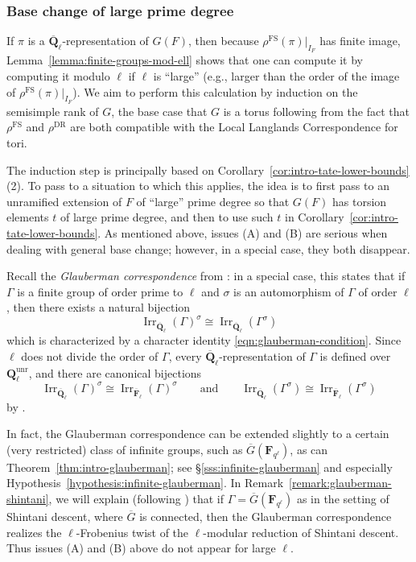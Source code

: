 \documentclass[reqno]{amsart}
\numberwithin{equation}{subsection}
\newcommand{\F}{\mathbf{F}}
\newcommand{\Q}{\mathbf{Q}}
\newcommand{\ol}[1]{\overline{#1}}
\DeclareMathOperator{\Irr}{Irr}
\DeclareMathOperator{\unr}{unr}
\DeclareMathOperator{\FS}{FS}
\DeclareMathOperator{\DR}{DR}
\theoremstyle{remark}
\numberwithin{equation}{subsection}
\numberwithin{figure}{subsection}
\begin{document}
\subsubsection{Base change of large prime degree}

If $\pi$ is a $\ol\Q_\ell$-representation of $G(F)$, then because $\rho^{\FS}(\pi)|_{I_F}$ has finite image, Lemma~\ref{lemma:finite-groups-mod-ell} shows that one can compute it by computing it modulo $\ell$ if $\ell$ is ``large'' (e.g., larger than the order of the image of $\rho^{\FS}(\pi)|_{I_F}$). We aim to perform this calculation by induction on the semisimple rank of $G$, the base case that $G$ is a torus following from the fact that $\rho^{\FS}$ and $\rho^{\DR}$ are both compatible with the Local Langlands Correspondence for tori.

The induction step is principally based on Corollary~\ref{cor:intro-tate-lower-bounds}(2). To pass to a situation to which this applies, the idea is to first pass to an unramified extension of $F$ of ``large'' prime degree so that $G(F)$ has torsion elements $t$ of large prime degree, and then to use such $t$ in Corollary~\ref{cor:intro-tate-lower-bounds}. As mentioned above, issues (A) and (B) are serious when dealing with general base change; however, in a special case, they both disappear.

Recall the \emph{Glauberman correspondence} from \cite{Gla68}: in a special case, this states that if $\Gamma$ is a finite group of order prime to $\ell$ and $\sigma$ is an automorphism of $\Gamma$ of order $\ell$, then there exists a natural bijection
\[
\Irr_{\ol\Q_\ell}(\Gamma)^\sigma \cong \Irr_{\ol\Q_\ell}(\Gamma^\sigma)
\]
which is characterized by a character identity \eqref{eqn:glauberman-condition}. Since $\ell$ does not divide the order of $\Gamma$, every $\ol\Q_\ell$-representation of $\Gamma$ is defined over $\Q_\ell^{\unr}$, and there are canonical bijections
\[
\Irr_{\ol\Q_\ell}(\Gamma)^\sigma \cong \Irr_{\ol\F_\ell}(\Gamma)^\sigma \qquad \text{and} \qquad \Irr_{\ol\Q_\ell}(\Gamma^\sigma) \cong \Irr_{\ol\F_\ell}(\Gamma^\sigma)
\]
by \cite[Part~III, no.\ 15.5, Proposition~43]{Serre77}.

In fact, the Glauberman correspondence can be extended slightly to a certain (very restricted) class of infinite groups, such as $\ol G(\F_{q^\ell})$, as can Theorem~\ref{thm:intro-glauberman}; see \S\ref{sss:infinite-glauberman} and especially Hypothesis~\ref{hypothesis:infinite-glauberman}. In Remark~\ref{remark:glauberman-shintani}, we will explain (following \cite{Dig86b}) that if $\Gamma = \ol G(\F_{q^\ell})$ as in the setting of Shintani descent, where $\ol G$ is connected, then the Glauberman correspondence realizes the $\ell$-Frobenius twist of the $\ell$-modular reduction of Shintani descent. Thus issues (A) and (B) above do not appear for large $\ell$.
\end{document}
